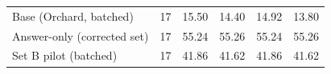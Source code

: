 \begin{table}[t]
{\begin{tabular}{lrrrrr}
Base (Orchard, batched) & 17 & 15.50 & 14.40 & 14.92 & 13.80 \\
Answer-only (corrected set) & 17 & 55.24 & 55.26 & 55.24 & 55.26 \\
Set B pilot (batched) & 17 & 41.86 & 41.62 & 41.86 & 41.62 \\

\end{tabular}}
\end{table}
